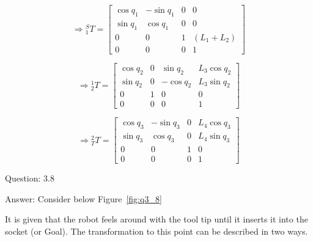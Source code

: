 \documentclass[a4paper]{article}
\begin{document}
\begin{qalist}
			\begin{equation}
				\Rightarrow {}^{S}_{1}T = 
				\begin{bmatrix}
					\cos{q}_{1} & -\sin{q}_{1} & 0 & 0 \\
					\sin{q}_{1} & \cos{q}_{1} & 0 & 0 \\
					0 & 0 & 1 & ({L}_{1} + {L}_{2}) \\
					0 & 0 & 0 & 1
				\end{bmatrix}
			\end{equation}
			
			\begin{equation}
				\Rightarrow {}^{1}_{2}T = 
				\begin{bmatrix}
					\cos{q}_{2} & 0 & \sin{q}_{2} & {L}_{3}\cos{q}_{2} \\
					\sin{q}_{2} & 0 & -\cos{q}_{2} & {L}_{3}\sin{q}_{2} \\
					0 & 1 & 0 & 0 \\
					0 & 0 & 0 & 1
				\end{bmatrix}
			\end{equation}
			
			\begin{equation}
				\Rightarrow {}^{2}_{T}T = 
				\begin{bmatrix}
					\cos{q}_{3} & -\sin{q}_{3} & 0 & {L}_{4}\cos{q}_{3} \\
					\sin{q}_{3} & \cos{q}_{3} & 0 & {L}_{4}\sin{q}_{3} \\
					0 & 0 & 1 & 0 \\
					0 & 0 & 0 & 1
				\end{bmatrix}
			\end{equation}
		
		\item[Question: 3.8] \setcounter{equation}{0} %
		\item[Answer:] Consider below Figure~\ref{fig:q3_8} \\
			\begin{minipage}{\linewidth}
				\vspace{0.5cm}
				\centering
				\label{fig:q3_8}
				\vspace{0.5cm}
			\end{minipage}
			It is given that the robot feels around with the tool tip until it inserts it into the socket (or Goal). 
			The transformation to this point can be described in two ways. 
			

\end{qalist}
\end{document}
